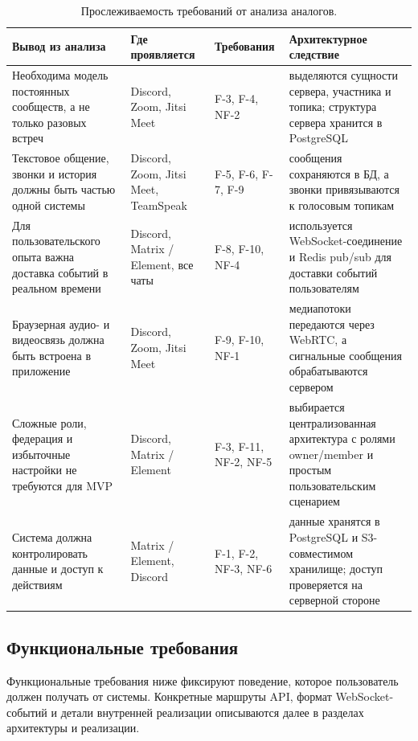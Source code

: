\documentclass[a4paper,12pt]{extarticle}
\begin{document}
\begin{table}[htbp]
\centering
\small
\renewcommand{\arraystretch}{1.2}
\footnotesize
\begin{tabular}{|p{4cm}|p{3.2cm}|p{3.6cm}|p{4.6cm}|}
\hline
\textbf{Вывод из анализа} & \textbf{Где проявляется} & \textbf{Требования} & \textbf{Архитектурное следствие} \\
\hline
Необходима модель постоянных сообществ, а не только разовых встреч & Discord, Zoom, Jitsi Meet & F-3, F-4, NF-2 & выделяются сущности сервера, участника и топика; структура сервера хранится в PostgreSQL \\
\hline
Текстовое общение, звонки и история должны быть частью одной системы & Discord, Zoom, Jitsi Meet, TeamSpeak & F-5, F-6, F-7, F-9 & сообщения сохраняются в БД, а звонки привязываются к голосовым топикам \\
\hline
Для пользовательского опыта важна доставка событий в реальном времени & Discord, Matrix / Element, все чаты & F-8, F-10, NF-4 & используется WebSocket-соединение и Redis pub/sub для доставки событий пользователям \\
\hline
Браузерная аудио- и видеосвязь должна быть встроена в приложение & Discord, Zoom, Jitsi Meet & F-9, F-10, NF-1 & медиапотоки передаются через WebRTC, а сигнальные сообщения обрабатываются сервером \\
\hline
Сложные роли, федерация и избыточные настройки не требуются для MVP & Discord, Matrix / Element & F-3, F-11, NF-2, NF-5 & выбирается централизованная архитектура с ролями owner/member и простым пользовательским сценарием \\
\hline
Система должна контролировать данные и доступ к действиям & Matrix / Element, Discord & F-1, F-2, NF-3, NF-6 & данные хранятся в PostgreSQL и S3-совместимом хранилище; доступ проверяется на серверной стороне \\
\hline
\end{tabular}
\caption{Прослеживаемость требований от анализа аналогов.}
\label{tab:req_trace}
\end{table}

\subsection{Функциональные требования}

Функциональные требования ниже фиксируют поведение, которое пользователь должен получать от системы. Конкретные маршруты API, формат WebSocket-событий и детали внутренней реализации описываются далее в разделах архитектуры и реализации.
\end{document}
